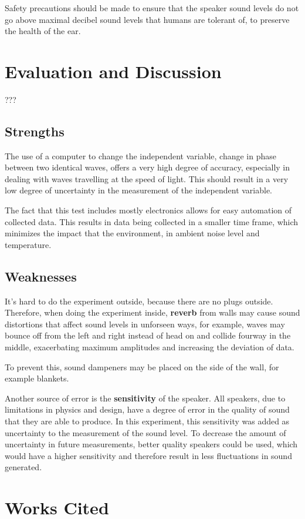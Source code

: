 \documentclass[index]{subfiles}
\begin{document}
Safety precautions should be made to ensure that the speaker sound levels do not go above maximal decibel sound levels that humans are tolerant of, to preserve the health of the ear.

\section{Evaluation and Discussion}???

\subsection{Strengths}

The use of a computer to change the independent variable, change in phase between two identical waves, offers a very high degree of accuracy, especially in dealing with waves travelling at the speed of light. This should result in a very low degree of uncertainty in the measurement of the independent variable.

The fact that this test includes mostly electronics allows for easy automation of collected data. This results in data being collected in a smaller time frame, which minimizes the impact that the environment, in ambient noise level and temperature.

\subsection{Weaknesses}

It's hard to do the experiment outside, because there are no plugs outside. Therefore, when doing the experiment inside, \textbf{reverb} from walls may cause sound distortions that affect sound levels in unforseen ways, for example, waves may bounce off from the left and right instead of head on and collide fourway in the middle, exacerbating maximum amplitudes and increasing the deviation of data.

To prevent this, sound dampeners may be placed on the side of the wall, for example blankets.

Another source of error is the \textbf{sensitivity} of the speaker. All speakers, due to limitations in physics and design, have a degree of error in the quality of sound that they are able to produce. In this experiment, this sensitivity was added as uncertainty to the measurement of the sound level. To decrease the amount of uncertainty in future measurements, better quality speakers could be used, which would have a higher sensitivity and therefore result in less fluctuations in sound generated.

\section{Works Cited}


\end{document}

